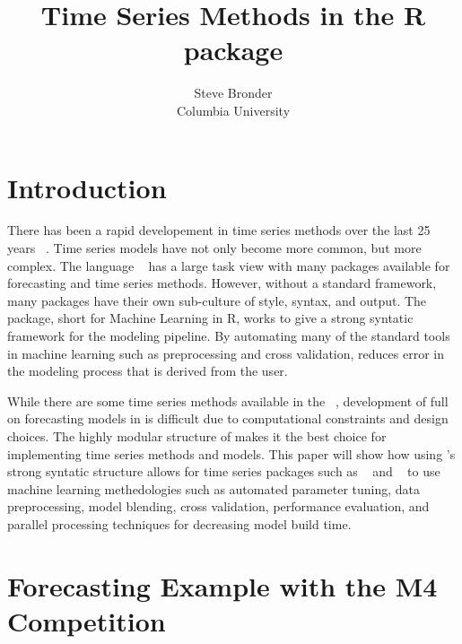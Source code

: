 \documentclass[article]{jss}\usepackage[]{graphicx}\usepackage[]{color}
\author{Steve Bronder\\ Columbia University}
\title{Time Series Methods in the R package \pkg{MLR}}
\begin{document}

\section{Introduction}

There has been a rapid developement in time series methods over the last 25 years ~\cite{Hyndman25}. Time series models have not only become more common, but more complex. The  language ~\cite{Rbase} has a large task view with many packages available for forecasting and time series methods. However, without a standard framework, many packages have their own sub-culture of style, syntax, and output. The  ~\cite{mlr} package, short for Machine Learning in R, works to give a strong syntatic framework for the modeling pipeline. By automating many of the standard tools in machine learning such as preprocessing and cross validation,  reduces error in the modeling process that is derived from the user. 

While there are some time series methods available in the  ~\cite{caret}, development of full on forecasting models in  is difficult due to computational constraints and design choices. The highly modular structure of  makes it the best choice for implementing time series methods and models. This paper will show how using 's strong syntatic structure allows for time series packages such as  ~\cite{HyndForecast} and  ~\cite{rugarch} to use machine learning methedologies such as automated parameter tuning, data preprocessing, model blending, cross validation, performance evaluation, and parallel processing techniques for decreasing model build time.

\section{Forecasting Example with the M4 Competition}
\end{document}
